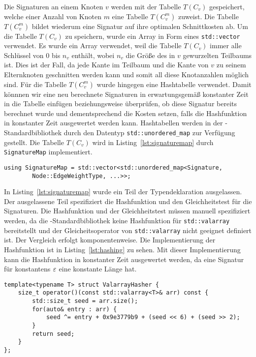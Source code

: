 Die Signaturen an einem Knoten $v$ werden mit der Tabelle $T(C_v)$ gespeichert, welche einer Anzahl von Knoten $m$ eine Tabelle $T(C_v^m)$ zuweist.
Die Tabelle $T(C_v^m)$ bildet wiederum eine Signatur auf ihre optimalen Schnittkosten ab.
Um die Tabelle $T(C_v)$ zu speichern, wurde ein Array in Form eines \texttt{std::vector} verwendet.
Es wurde ein Array verwendet, weil die Tabelle $T(C_v)$ immer alle Schlüssel von $0$ bis $n_v$ enthält, wobei $n_v$ die Größe des in $v$ gewurzelten Teilbaums ist.
Dies ist der Fall, da jede Kante im Teilbaum und die Kante von $v$ zu seinem Elternknoten geschnitten werden kann und somit all diese Knotanzahlen möglich sind.
Für die Tabelle $T(C_v^m)$ wurde hingegen eine Hashtabelle verwendet.
 Damit könnnen wir eine neu berechnete Signaturen in erwartungsgemäß konstanter Zeit in die Tabelle einfügen beziehungsweise überprüfen, ob diese Signatur bereits berechnet wurde und dementsprechend die Kosten setzen, falls die Hashfunktion in konstanter Zeit ausgewertet werden kann.
Hashtabellen werden in der \Cpp\hyp Standardbibliothek durch den Datentyp \texttt{std::unordered\_map} zur Verfügung gestellt.
Die Tabelle $T(C_v)$ wird in Listing~\ref{lst:signaturemap} durch \texttt{SignatureMap} implementiert.

\begin{lstlisting}[caption={Definition von \texttt{SignatureMap}}, label={lst:signaturemap}]
    using SignatureMap = std::vector<std::unordered_map<Signature, 
        Node::EdgeWeightType, ...>>;
\end{lstlisting}

In Listing~\ref{lst:signaturemap} wurde ein Teil der Typendeklaration ausgelassen.
Der ausgelassene Teil spezifiziert die Hashfunktion und den Gleichheitstest für die Signaturen.
Die Hashfunktion und der Gleichheitstest müssen manuell spezifiziert werden, da die \Cpp{}\hyp Standardbibliothek keine Hashfunktion für \texttt{std::valarray} bereitstellt und der Gleicheitsoperator von \texttt{std::valarray} nicht geeignet definiert ist.
Der Vergleich erfolgt komponentenweise.
Die Implementierung der Hashfunktion ist in Listing~\ref{lst:hashing} zu sehen.
Mit dieser Implementierung kann die Hashfunktion in konstanter Zeit ausgewertet werden, da eine Signatur für konstantens $\varepsilon$ eine konstante Länge hat.

\begin{lstlisting}[float, floatplacement=h, caption={Hashing mit \texttt{ValarrayHasher}}, label={lst:hashing}]
template<typename T> struct ValarrayHasher {
    size_t operator()(const std::valarray<T>& arr) const {
		std::size_t seed = arr.size();
		for(auto& entry : arr) {
			seed ^= entry + 0x9e3779b9 + (seed << 6) + (seed >> 2);
		}
		return seed;
	}
};
\end{lstlisting}

